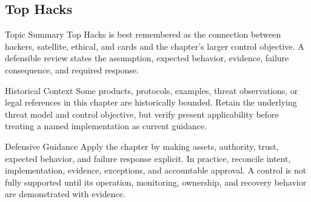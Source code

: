 \documentclass[11pt,letterpaper]{article}
\begin{document}
\subsection*{Top Hacks}
\begin{CornellNotesTable}
\end{CornellNotesTable}
\begin{CornellSummaryBox}{Topic Summary}
Top Hacks is best remembered as the connection between hackers, satellite, ethical, and cards and the chapter's larger control objective. A defensible review states the assumption, expected behavior, evidence, failure consequence, and required response.
\end{CornellSummaryBox}
\begin{CornellWarningBox}{Historical Context}
Some products, protocols, examples, threat observations, or legal references in this chapter are historically bounded. Retain the underlying threat model and control objective, but verify present applicability before treating a named implementation as current guidance.
\end{CornellWarningBox}
\begin{CornellOverviewBox}{Defensive Guidance}
Apply the chapter by making assets, authority, trust, expected behavior, and failure response explicit. In practice, reconcile intent, implementation, evidence, exceptions, and accountable approval. A control is not fully supported until its operation, monitoring, ownership, and recovery behavior are demonstrated with evidence.
\end{CornellOverviewBox}
\end{document}
